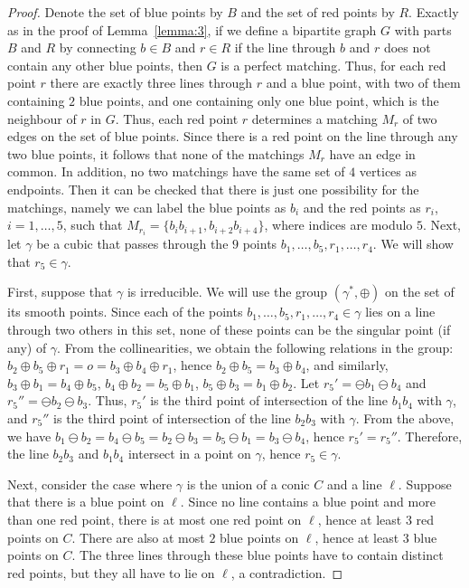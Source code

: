 \documentclass[a4paper,11pt,leqno]{article}
\begin{document}
\begin{proof}
Denote the set of blue points by $B$ and the set of red points by $R$.
Exactly as in the proof of Lemma~\ref{lemma:3}, if we define a bipartite graph $G$ with parts $B$ and $R$ by connecting $b\in B$ and $r\in R$ if the line through $b$ and $r$ does not contain any other blue points, then $G$ is a perfect matching.
Thus, for each red point $r$ there are exactly three lines through $r$ and a blue point, with two of them containing $2$ blue points, and one containing only one blue point, which is the neighbour of $r$ in $G$.
Thus, each red point $r$ determines a matching $M_r$ of two edges on the set of blue points.
Since there is a red point on the line through any two blue points, it follows that none of the matchings $M_r$ have an edge in common.
In addition, no two matchings have the same set of $4$ vertices as endpoints.
Then it can be checked that there is just one possibility for the matchings, namely we can label the blue points as $b_i$ and the red points as $r_i$, $i=1,\dots,5$, such that $M_{r_i}=\{b_i b_{i+1}, b_{i+2}b_{i+4}\}$, where indices are modulo $5$.
Next, let $\gamma$ be a cubic that passes through the $9$ points $b_1,\dots,b_5,r_1,\dots,r_4$.
We will show that $r_5\in\gamma$.

First, suppose that $\gamma$ is irreducible.
We will use the group $(\gamma^*,\oplus)$ on the set of its smooth points.
Since each of the points $b_1,\dots,b_5,r_1,\dots,r_4\in \gamma$ lies on a line through two others in this set, none of these points can be the singular point (if any) of $\gamma$.
From the collinearities, we obtain the following relations in the group:
$b_2\oplus b_5\oplus r_1=o=b_3\oplus b_4\oplus r_1$, hence
$b_2\oplus b_5=b_3\oplus b_4$, and similarly,
$b_3\oplus b_1=b_4\oplus b_5$,
$b_4\oplus b_2=b_5\oplus b_1$,
$b_5\oplus b_3=b_1\oplus b_2$.
Let $r_5'=\ominus b_1\ominus b_4$ and
$r_5''=\ominus b_2\ominus b_3$.
Thus, $r_5'$ is the third point of intersection of the line $b_1b_4$ with $\gamma$, and
$r_5''$ is the third point of intersection of the line $b_2b_3$ with $\gamma$.
From the above, we have $b_1\ominus b_2 = b_4\ominus b_5 = b_2\ominus b_3 = b_5\ominus b_1 = b_3\ominus b_4$, hence $r_5'=r_5''$.
Therefore, the line $b_2b_3$ and $b_1b_4$ intersect in a point on $\gamma$, hence $r_5\in\gamma$.

Next, consider the case where $\gamma$ is the union of a conic $C$ and a line $\ell$.
Suppose that there is a blue point on $\ell$.
Since no line contains a blue point and more than one red point, there is at most one red point on $\ell$, hence at least $3$ red points on $C$.
There are also at most $2$ blue points on $\ell$, hence at least $3$ blue points on $C$.
The three lines through these blue points have to contain distinct red points, but they all have to lie on $\ell$, a contradiction.


\end{proof}
\end{document}
